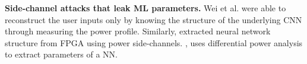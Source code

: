 
\textbf{{Side-channel attacks that leak ML parameters.}}
Wei et al. \cite{wei2018know} were able to reconstruct the user inputs only by knowing the structure of the underlying CNN through measuring the power profile. Similarly, \cite{zhang2021stealing, tian2021remote} extracted neural network structure from FPGA using power side-channels.
\cite{dubey2020maskednet}, uses differential power analysis to extract parameters of a NN.



